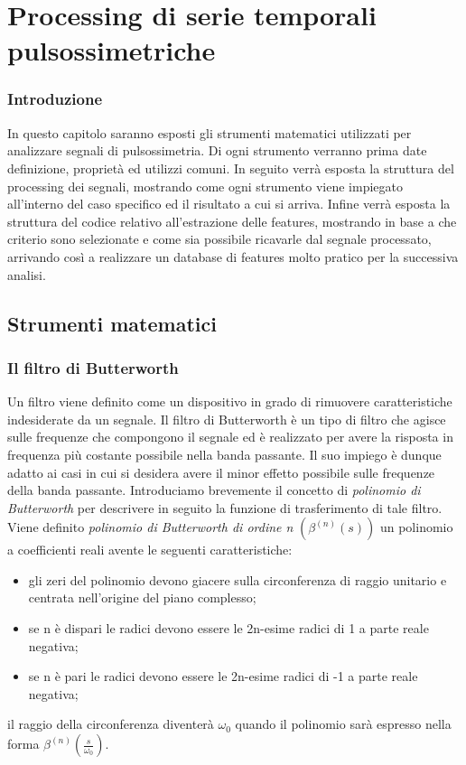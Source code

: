 \documentclass[a4paper, 12pt]{book}
\begin{document}
\chapter{Processing di serie temporali pulsossimetriche}


\subsection{Introduzione}

In questo capitolo saranno esposti gli strumenti matematici utilizzati per analizzare segnali di pulsossimetria.
Di ogni strumento verranno prima date definizione, proprietà ed utilizzi comuni.
In seguito verrà esposta la struttura del processing dei segnali, mostrando come ogni strumento viene impiegato all'interno del caso specifico ed il risultato a cui si arriva.
Infine verrà esposta la struttura del codice relativo all'estrazione delle features, mostrando in base a che criterio sono selezionate e come sia possibile ricavarle dal segnale processato, arrivando così a realizzare un database di features molto pratico per la successiva analisi.


\section{Strumenti matematici}


\subsection{Il filtro di Butterworth}

Un filtro viene definito come un dispositivo in grado di rimuovere caratteristiche indesiderate da un segnale.
Il filtro di Butterworth è un tipo di filtro che agisce sulle frequenze che compongono il segnale ed è realizzato per avere la risposta in frequenza più costante possibile nella banda passante.
Il suo impiego è dunque adatto ai casi in cui si desidera avere il minor effetto possibile sulle frequenze della banda passante.
Introduciamo brevemente il concetto di \textit{polinomio di Butterworth} per descrivere in seguito la funzione di trasferimento di tale filtro.
Viene definito \textit{polinomio di Butterworth di ordine n} $(\beta^{(n)}(s) )$ un polinomio a coefficienti reali avente le seguenti caratteristiche:\begin{itemize}
    \item gli zeri del polinomio devono giacere sulla circonferenza di raggio unitario 				  e centrata nell'origine del piano complesso;
    \item se n è dispari le radici devono essere le 2n-esime radici di 1 a parte reale 				  negativa;
    \item se n è pari le radici devono essere le 2n-esime radici di -1 a parte reale 				  negativa;
\end{itemize}
il raggio della circonferenza diventerà $\omega_0$ quando il polinomio sarà espresso nella forma $\beta^{(n)}(\frac{s}{\omega_0})$.
\end{document}
